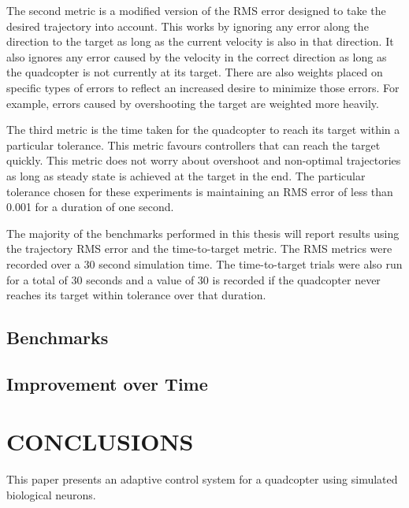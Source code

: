 \documentclass[letterpaper, 10 pt, conference]{ieeeconf}  %
\begin{document}
The second metric is a modified version of the RMS error designed to take the desired trajectory into account.
This works by ignoring any error along the direction to the target as long as the current velocity is also in that direction.
It also ignores any error caused by the velocity in the correct direction as long as the quadcopter is not currently at its target.
There are also weights placed on specific types of errors to reflect an increased desire to minimize those errors.
For example, errors caused by overshooting the target are weighted more heavily.

The third metric is the time taken for the quadcopter to reach its target within a particular tolerance. 
This metric favours controllers that can reach the target quickly.
This metric does not worry about overshoot and non-optimal trajectories as long as steady state is achieved at the target in the end.
The particular tolerance chosen for these experiments is maintaining an RMS error of less than 0.001 for a duration of one second.

The majority of the benchmarks performed in this thesis will report results using the trajectory RMS error and the time-to-target metric.
The RMS metrics were recorded over a 30 second simulation time.
The time-to-target trials were also run for a total of 30 seconds and a value of 30 is recorded if the quadcopter never reaches its target within tolerance over that duration.

\subsection{Benchmarks}
\subsection{Improvement over Time}

\section{CONCLUSIONS}

This paper presents an adaptive control system for a quadcopter using simulated biological neurons.


\addtolength{\textheight}{-12cm}   %
\end{document}
